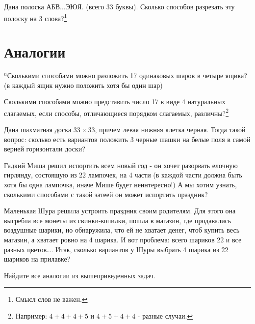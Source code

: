\begin{thm}
	Дана полоска $АБВ \dots ЭЮЯ$. (всего 33 буквы). Сколько способов разрезать эту полоску на 3 слова?\footnote{Смысл слов не важен.}
\end{thm}

\section{Аналогии}

\begin{thm}
	$^n$Сколькими способами можно разложить 17 одинаковых шаров в четыре ящика? (в каждый ящик нужно положить хотя бы один шар)
\end{thm}

\begin{thm}
	Сколькими способами можно представить число 17 в виде 4 натуральных слагаемых, если способы, отличающиеся порядком слагаемых, различны?\footnote{Например: $4+4+4+5$ и $4+5+4+4$ - разные случаи.}
\end{thm}

\begin{thm}
	Дана шахматная доска $33\times33$, причем левая нижняя клетка черная. Тогда такой вопрос: сколько есть вариантов положить 3 черные шашки на белые поля в самой верней горизонтали доски?
\end{thm}

\begin{thm}
	Гадкий Миша решил испортить всем новый год - он хочет разорвать елочную гирлянду, состоящую из 22 лампочек, на 4 части (в каждой части должна быть хотя бы одна лампочка, иначе Мише будет неинтересно!) А мы хотим узнать, сколькими способами с такой затеей он может испортить праздник?
\end{thm}

\begin{thm}
	Маленькая Шура решила устроить праздник своим родителям. Для этого она выгребла все монеты из свинки-копилки, пошла в магазин, где продавались воздушные шарики, но обнаружила, что ей не хватает денег, чтоб купить весь магазин, а хватает ровно на 4 шарика. И вот проблема: всего шариков 22 и все разных цветов…. Итак, сколько вариантов у Шуры выбрать 4 шарика из 22 шариков на прилавке?
\end{thm}

\begin{ex}
	Найдите все аналогии из вышеприведенных задач.
\end{ex}

